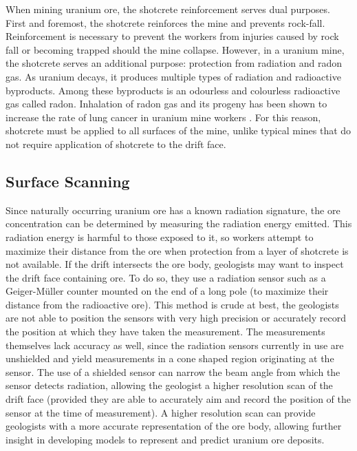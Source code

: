 When mining uranium ore, the shotcrete reinforcement serves dual purposes. First and foremost, the shotcrete reinforces the mine and prevents rock-fall. Reinforcement is necessary to prevent the workers from injuries caused by rock fall or becoming trapped should the mine collapse. However, in a uranium mine, the shotcrete serves an additional purpose: protection from radiation and radon gas. As uranium decays, it produces multiple types of radiation and radioactive byproducts. Among these byproducts is an odourless and colourless radioactive gas called radon. Inhalation of radon gas and its progeny has been shown to increase the rate of lung cancer in uranium mine workers \cite{radon}. For this reason, shotcrete must be applied to all surfaces of the mine, unlike typical mines that do not require application of shotcrete to the drift face.\\

\subsection{Surface Scanning}

Since naturally occurring uranium ore has a known radiation signature, the ore concentration can be determined by measuring the radiation energy emitted. This radiation energy is harmful to those exposed to it, so workers attempt to maximize their distance from the ore when protection from a layer of shotcrete is not available. If the drift intersects the ore body, geologists may want to inspect the drift face containing ore. To do so, they use a radiation sensor such as a Geiger-M{\"u}ller counter mounted on the end of a long pole (to maximize their distance from the radioactive ore). This method is crude at best, the geologists are not able to position the sensors with very high precision or accurately record the position at which they have taken the measurement. The measurements themselves lack accuracy as well, since the radiation sensors currently in use are unshielded and yield measurements in a cone shaped region originating at the sensor. The use of a shielded sensor can narrow the beam angle from which the sensor detects radiation, allowing the geologist a higher resolution scan of the drift face (provided they are able to accurately aim and record the position of the sensor at the time of measurement). A higher resolution scan can provide geologists with a more accurate representation of the ore body, allowing further insight in developing models to represent and predict uranium ore deposits.\\


